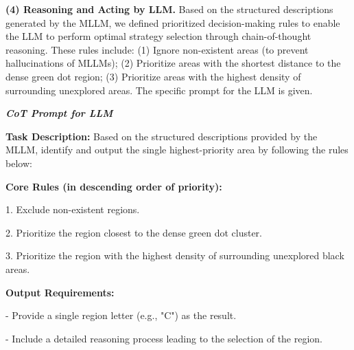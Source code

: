 \textbf{(4) Reasoning and Acting by LLM.} Based on the structured descriptions generated by the MLLM, we defined prioritized decision-making rules to enable the LLM to perform optimal strategy selection through chain-of-thought reasoning. These rules include: (1) Ignore non-existent areas (to prevent hallucinations of MLLMs); (2) Prioritize areas with the shortest distance to the dense green dot region; (3) Prioritize areas with the highest density of surrounding unexplored areas. The specific prompt for the LLM is given.


\begin{center}
\begin{minipage}{\linewidth}
\begin{shaded}
\textit{\textbf{CoT Prompt for LLM}}

\textbf{Task Description:}
Based on the structured descriptions provided by the MLLM, identify and output the single highest-priority area by following the rules below:

\textbf{Core Rules (in descending order of priority):}

1. Exclude non-existent regions.  

2. Prioritize the region closest to the dense green dot cluster.  

3. Prioritize the region with the highest density of surrounding unexplored black areas.

\textbf{Output Requirements:}

- Provide a single region letter (e.g., "C") as the result.

- Include a detailed reasoning process leading to the selection of the region.

\end{shaded}
\end{minipage}
\end{center}












